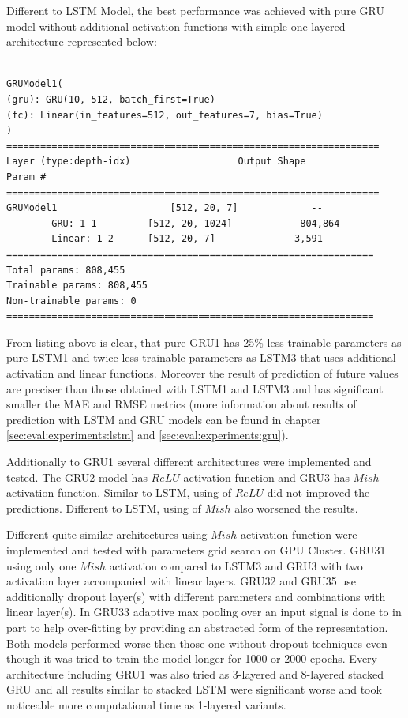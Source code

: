 Different to LSTM Model, the best performance was achieved with pure GRU model without additional activation functions with simple one-layered architecture represented below:
\begin{lstlisting}[caption={GRU1 with Sliding Window},captionpos=b]

GRUModel1(
(gru): GRU(10, 512, batch_first=True)
(fc): Linear(in_features=512, out_features=7, bias=True)
)
==================================================================
Layer (type:depth-idx)                   Output Shape              Param #
==================================================================
GRUModel1                    [512, 20, 7]             --
	--- GRU: 1-1         [512, 20, 1024]            804,864
	--- Linear: 1-2      [512, 20, 7]              3,591
=================================================================
Total params: 808,455
Trainable params: 808,455
Non-trainable params: 0
=================================================================
\end{lstlisting}

From listing above is clear, that pure GRU1 has 25\% less trainable parameters as pure LSTM1 and twice less trainable parameters as LSTM3 that uses additional activation and linear functions. Moreover the result of prediction of future values are preciser than those obtained with LSTM1 and LSTM3 and has significant smaller the MAE and RMSE metrics (more information about results of prediction with LSTM and GRU models can be found in chapter \ref{sec:eval:experiments:lstm} and \ref{sec:eval:experiments:gru}). 

Additionally to GRU1 several different architectures were implemented and tested. The GRU2 model has $ReLU$-activation function and GRU3 has $Mish$-activation function. Similar to LSTM, using of $ReLU$ did not improved the predictions. Different to LSTM, using of $Mish$ also worsened the results.     

Different quite similar architectures using $Mish$ activation function were implemented and tested with parameters grid search on GPU Cluster. GRU31 using only one $Mish$ activation compared to LSTM3 and GRU3 with two activation layer accompanied with linear layers. GRU32 and GRU35 use additionally dropout layer(s) with different parameters and combinations with linear layer(s). In GRU33 adaptive max pooling over an input signal is done to in part to help over-fitting by providing an abstracted form of the representation. Both models performed worse then those one without dropout techniques even though it was tried to train the model longer for 1000 or 2000 epochs. Every architecture including GRU1 was also tried as 3-layered and 8-layered stacked GRU and all results similar to stacked LSTM were significant worse and took noticeable more computational time as 1-layered variants.

